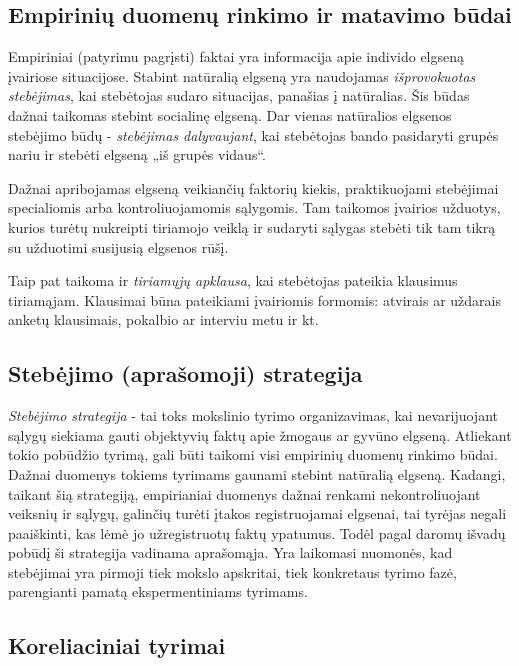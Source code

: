 \label{tema:psichologijos_metodai}

\subsection{Empirinių duomenų rinkimo ir matavimo būdai}

Empiriniai (patyrimu pagrįsti) faktai yra informacija apie individo elgseną
įvairiose situacijose. Stabint natūralią elgseną yra naudojamas 
\emph{išprovokuotas stebėjimas}, kai stebėtojas sudaro situacijas, panašias 
į natūralias. Šis būdas dažnai taikomas stebint socialinę elgseną. Dar 
vienas natūralios elgsenos stebėjimo būdų - \emph{stebėjimas dalyvaujant}, 
kai stebėtojas bando pasidaryti grupės nariu ir stebėti elgseną „iš grupės 
vidaus“.

Dažnai apribojamas elgseną veikiančių faktorių kiekis, praktikuojami stebėjimai
specialiomis arba kontroliuojamomis sąlygomis. Tam taikomos įvairios užduotys,
kurios turėtų nukreipti tiriamojo veiklą ir sudaryti sąlygas stebėti tik tam
tikrą su užduotimi susijusią elgsenos rūšį.

Taip pat taikoma ir \emph{tiriamųjų apklausa}, kai stebėtojas pateikia klausimus
tiriamąjam. Klausimai būna pateikiami įvairiomis formomis: atvirais ar 
uždarais anketų klausimais, pokalbio ar interviu metu ir kt.

\subsection{Stebėjimo (aprašomoji) strategija}

\emph{Stebėjimo strategija} - tai toks mokslinio tyrimo organizavimas, kai 
nevarijuojant sąlygų siekiama gauti objektyvių faktų apie žmogaus ar gyvūno 
elgseną. Atliekant tokio pobūdžio tyrimą, gali būti taikomi visi empirinių 
duomenų rinkimo būdai. Dažnai duomenys tokiems tyrimams gaunami stebint 
natūralią elgseną. Kadangi, taikant šią strategiją, empirianiai duomenys 
dažnai renkami nekontroliuojant veiksnių ir sąlygų, galinčių turėti įtakos 
registruojamai elgsenai, tai tyrėjas negali paaiškinti, kas lėmė jo 
užregistruotų faktų ypatumus. Todėl pagal daromų išvadų pobūdį ši strategija 
vadinama aprašomąja. Yra laikomasi nuomonės, kad stebėjimai yra pirmoji tiek
mokslo apskritai, tiek konkretaus tyrimo fazė, parengianti pamatą 
ekspermentiniams tyrimams.

\subsection{Koreliaciniai tyrimai}

